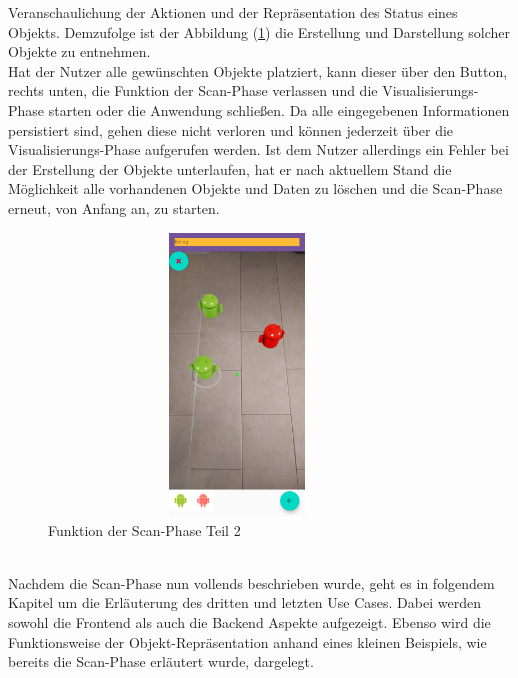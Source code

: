 Veranschaulichung der Aktionen und der Repräsentation des Status eines Objekts. Demzufolge ist der Abbildung (\ref{pic:place_objects}) die Erstellung und 
Darstellung solcher Objekte zu entnehmen. 
\\ 
\linebreak
Hat der Nutzer alle gewünschten Objekte platziert, kann dieser über den Button, rechts unten, die Funktion der Scan-Phase verlassen und die 
Visualisierungs-Phase starten oder die Anwendung schließen. Da alle eingegebenen Informationen persistiert sind, gehen diese nicht verloren und können jederzeit 
über die Visualisierungs-Phase aufgerufen werden. Ist dem Nutzer allerdings ein Fehler bei der Erstellung der Objekte unterlaufen, hat er nach aktuellem Stand 
die Möglichkeit alle vorhandenen Objekte und Daten zu löschen und die Scan-Phase erneut, von Anfang an, zu starten.  
\begin{figure}[hbt!]
    \centering
    \includegraphics[width=10cm,height=7.5cm,keepaspectratio]{4Umsetzung/Bilder/place_objects_view.jpg}
    \caption{Funktion der Scan-Phase Teil 2}
    \label{pic:place_objects}
\end{figure}
\pagebreak
\\ 
\linebreak
Nachdem die Scan-Phase nun vollends beschrieben wurde, geht es in folgendem Kapitel um die Erläuterung des dritten und letzten Use Cases. Dabei werden sowohl 
die Frontend als auch die Backend Aspekte aufgezeigt. Ebenso wird die Funktionsweise der Objekt-Repräsentation anhand eines kleinen Beispiels, wie bereits 
die Scan-Phase erläutert wurde, dargelegt.